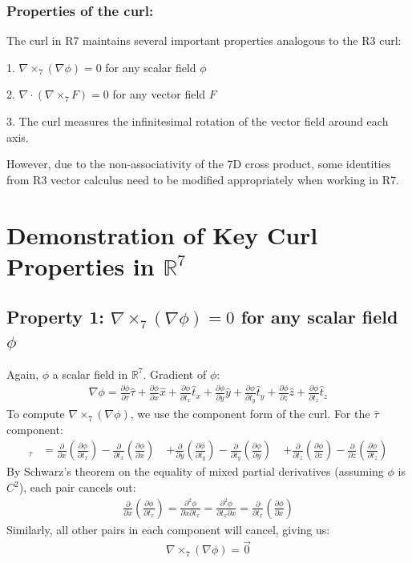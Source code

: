 \documentclass{article}
\begin{document}
\subsubsection{Properties of the curl:}
The curl in R7 maintains several important properties analogous to the R3 curl:

1. $\nabla \times_{7} (\nabla \phi) = 0$ for any scalar field $\phi$

2. $\nabla \cdot (\nabla \times_{7} F) = 0$ for any vector field $F$

3. The curl measures the infinitesimal rotation of the vector field around each axis.

However, due to the non-associativity of the 7D cross product, some identities from R3 vector calculus need to be modified appropriately when working in R7.


\section{Demonstration of Key Curl Properties in $\mathbb{R}^7$}
\subsection{Property 1: $\nabla \times_7 (\nabla \phi) = 0$ for any scalar field $\phi$}
Again, $\phi$ a scalar field in $\mathbb{R}^7$. Gradient of $\phi$:
\begin{align*}
\nabla \phi = \frac{\partial \phi}{\partial \tau}\hat{\tau} + \frac{\partial \phi}{\partial x}\hat{x} + \frac{\partial \phi}{\partial t_x}\hat{t}_x + \frac{\partial \phi}{\partial y}\hat{y} + \frac{\partial \phi}{\partial t_y}\hat{t}_y + \frac{\partial \phi}{\partial z}\hat{z} + \frac{\partial \phi}{\partial t_z}\hat{t}_z
\end{align*}
To compute $\nabla \times_7 (\nabla \phi)$, we use the component form of the curl. For the $\hat{\tau}$ component:
\begin{align*}
[\nabla \times_7 (\nabla \phi)]_\tau &= \frac{\partial}{\partial x}\left(\frac{\partial \phi}{\partial t_x}\right) - \frac{\partial}{\partial t_x}\left(\frac{\partial \phi}{\partial x}\right) \
&+ \frac{\partial}{\partial y}\left(\frac{\partial \phi}{\partial t_y}\right) - \frac{\partial}{\partial t_y}\left(\frac{\partial \phi}{\partial y}\right) \
&+ \frac{\partial}{\partial t_z}\left(\frac{\partial \phi}{\partial z}\right) - \frac{\partial}{\partial z}\left(\frac{\partial \phi}{\partial t_z}\right)
\end{align*}
By Schwarz's theorem on the equality of mixed partial derivatives (assuming $\phi$ is $C^2$), each pair cancels out:
\begin{align*}
\frac{\partial}{\partial x}\left(\frac{\partial \phi}{\partial t_x}\right) = \frac{\partial^2 \phi}{\partial x \partial t_x} = \frac{\partial^2 \phi}{\partial t_x \partial x} = \frac{\partial}{\partial t_x}\left(\frac{\partial \phi}{\partial x}\right)
\end{align*}
Similarly, all other pairs in each component will cancel, giving us:
\begin{align*}
\nabla \times_7 (\nabla \phi) = \vec{0}
\end{align*}
\end{document}
